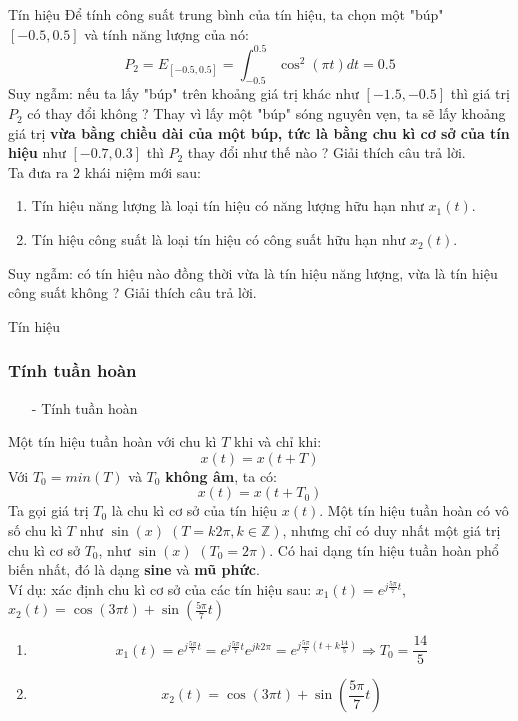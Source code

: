 \documentclass[8pt]{beamer}
\begin{document}
\begin{frame}{Tín hiệu}
Để tính công suất trung bình của tín hiệu, ta chọn một "búp" $[-0.5,0.5]$ và tính năng lượng của nó:
$$P_{2}=E_{[-0.5,0.5]}=\int_{-0.5}^{0.5}\cos^2{(\pi t)}dt=0.5$$
Suy ngẫm: nếu ta lấy "búp" trên khoảng giá trị khác như $[-1.5, -0.5]$ thì giá trị $P_{2}$ có thay đổi không ? Thay vì lấy một "búp" sóng nguyên vẹn, ta sẽ lấy khoảng giá trị \textbf{vừa bằng chiều dài của một búp, tức là bằng chu kì cơ sở của tín hiệu} như $[-0.7, 0.3]$ thì $P_{2}$ thay đổi như thế nào ? Giải thích câu trả lời.
\\ Ta đưa ra $2$ khái niệm mới sau:
\begin{enumerate}
	\item Tín hiệu năng lượng là loại tín hiệu có năng lượng \alert{hữu hạn} như $x_{1}(t)$.

	\item Tín hiệu công suất là loại tín hiệu có công suất \alert{hữu hạn} như $x_{2}(t)$.
\end{enumerate}
Suy ngẫm: có tín hiệu nào đồng thời vừa là tín hiệu năng lượng, vừa là tín hiệu công suất không ? Giải thích câu trả lời.
\end{frame}
\begin{frame}{Tín hiệu}
\subsubsection{Tính tuần hoàn}
\begin{itemize}
	\item[-] Tính tuần hoàn
\end{itemize}
Một tín hiệu tuần hoàn với chu kì $T$ khi và chỉ khi:
$$x(t)=x(t+T)$$
Với $T_{0}=min(T)$ và $T_{0}$ \textbf{không âm}, ta có:
$$x(t)=x(t+T_{0})$$
Ta gọi giá trị $T_{0}$ là \alert{chu kì cơ sở của tín hiệu $x(t)$}. Một tín hiệu tuần hoàn có vô số chu kì $T$ như $\sin{(x)}\; (T=k2\pi, k \in \mathbb{Z})$, nhưng chỉ có \alert{duy nhất} một giá trị chu kì cơ sở $T_{0}$, như $\sin{(x)}$ $(T_{0}=2\pi)$. Có hai dạng tín hiệu tuần hoàn phổ biến nhất, đó là dạng \textbf{sine} và \textbf{mũ phức}.
\\ Ví dụ: xác định chu kì cơ sở của các tín hiệu sau: $x_{1}(t)=e^{j\frac{5\pi}{7}t}$, $x_{2}(t)=\cos{(3\pi t)}+\sin{(\frac{5\pi}{7}t)}$
\begin{enumerate}
	\item $$x_{1}(t)=e^{j\frac{5\pi}{7}t}=e^{j\frac{5\pi}{7}t}e^{jk2\pi}=e^{j\frac{5\pi}{7}(t+k\frac{14}{5})}\Rightarrow T_{0}=\frac{14}{5}$$
	\item $$x_{2}(t)=\cos{(3\pi t)}+\sin{\left(\frac{5\pi}{7}t\right)}$$
\end{enumerate}
\end{frame}
\end{document}
